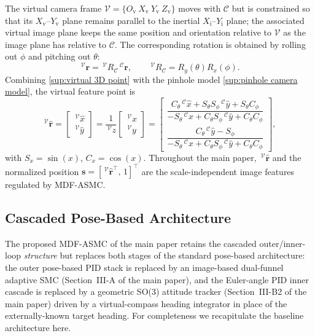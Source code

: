 \documentclass[10pt,journal]{IEEEtran}
\begin{document}
The virtual camera frame $\mathcal{V}=\{O_{\text{v}}~X_{\text{v}}~Y_{\text{v}}~Z_{\text{v}}\}$ moves with $\mathcal{C}$ but is constrained so that its $X_{\text{v}}$--$Y_{\text{v}}$ plane remains parallel to the inertial $X_{\text{i}}$--$Y_{\text{i}}$ plane; the associated virtual image plane keeps the same position and orientation relative to $\mathcal{V}$ as the image plane has relative to $\mathcal{C}$. The corresponding rotation is obtained by rolling out $\phi$ and pitching out $\theta$:
\begin{equation}
\label{sup:virtual 3D point}
    \,^\mathcal{V}\boldsymbol{r} = \,^\mathcal{V}R_\mathcal{C}\,^\mathcal{C}\boldsymbol{r}, \qquad \,^\mathcal{V}R_\mathcal{C} = R_y(\theta)R_x(\phi).
\end{equation}
Combining \eqref{sup:virtual 3D point} with the pinhole model \eqref{sup:pinhole camera model}, the virtual feature point is
\begin{equation}
\label{sup:virtual feature point}
    \,^\mathcal{V}\boldsymbol{\hat{r}} = \begin{bmatrix} \,^\mathcal{V}\hat{x} \\ \,^\mathcal{V}\hat{y} \end{bmatrix}
    = \frac{1}{\,^\mathcal{V}z}\begin{bmatrix} \,^\mathcal{V}x \\ \,^\mathcal{V}y \end{bmatrix}
    = \begin{bmatrix}
        \dfrac{C_\theta\,^\mathcal{C}\hat{x} + S_\theta S_\phi\,^\mathcal{C}\hat{y} + S_\theta C_\phi}{-S_\theta\,^\mathcal{C}\hat{x} + C_\theta S_\phi\,^\mathcal{C}\hat{y} + C_\theta C_\phi} \\[4pt]
        \dfrac{C_\theta\,^\mathcal{C}\hat{y} - S_\phi}{-S_\theta\,^\mathcal{C}\hat{x} + C_\theta S_\phi\,^\mathcal{C}\hat{y} + C_\theta C_\phi}
    \end{bmatrix},
\end{equation}
with $S_x=\sin(x)$, $C_x=\cos(x)$. Throughout the main paper, $\,^\mathcal{V}\boldsymbol{\hat{r}}$ and the normalized position $\boldsymbol{s}=[\,^\mathcal{V}\boldsymbol{\hat{r}}^\top,\,1]^\top$ are the scale-independent image features regulated by MDF-ASMC.

\subsection{Cascaded Pose-Based Architecture}
\label{sup:cascaded_baseline}
The proposed MDF-ASMC of the main paper retains the cascaded outer/inner-loop \emph{structure} but replaces both stages of the standard pose-based architecture: the outer pose-based PID stack is replaced by an image-based dual-funnel adaptive SMC (Section~III-A of the main paper), and the Euler-angle PID inner cascade is replaced by a geometric SO(3) attitude tracker (Section~III-B2 of the main paper) driven by a virtual-compass heading integrator in place of the externally-known target heading. For completeness we recapitulate the baseline architecture here.
\end{document}
